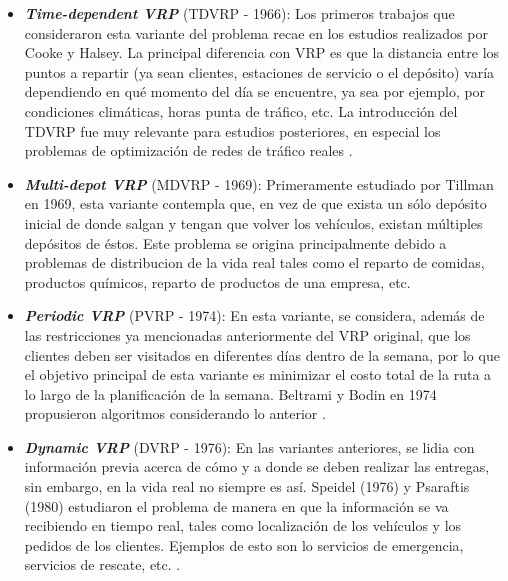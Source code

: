\documentclass[letter, 10pt]{article}
\begin{document}
\begin{itemize}
    \item \textbf{\emph{Time-dependent VRP}} (TDVRP - 1966): Los primeros trabajos que consideraron esta variante del problema recae en los estudios realizados por Cooke y Halsey. La principal diferencia con VRP es que la distancia entre los puntos a repartir (ya sean clientes, estaciones de  servicio o el depósito) varía dependiendo en qué momento del día se encuentre, ya sea por ejemplo, por condiciones climáticas, horas punta de tráfico, etc. La introducción del TDVRP fue muy relevante para estudios posteriores, en especial los problemas de optimización de redes de tráfico reales  \cite{Cooke1966TheSR}.

    \item \textbf{\emph{Multi-depot VRP}} (MDVRP - 1969): Primeramente estudiado por Tillman en 1969, esta variante contempla que, en vez de que exista un sólo depósito inicial de donde salgan y tengan que volver los vehículos, existan múltiples depósitos de éstos. Este problema se origina principalmente debido a problemas de distribucion de la vida real tales como el reparto de comidas, productos químicos, reparto de productos de una empresa, etc. \cite{doi:10.1287/trsc.3.3.192}
    
    \item \textbf{\emph{Periodic VRP}} (PVRP - 1974): En esta variante, se considera, además de las restricciones ya mencionadas anteriormente del VRP original, que los clientes deben ser visitados en diferentes días dentro de la semana, por lo que el objetivo principal de esta variante es minimizar el costo total de la ruta a lo largo de la planificación de la semana. Beltrami y Bodin en 1974 propusieron algoritmos considerando lo anterior \cite{https://doi.org/10.1002/net.3230040106}.
    
    \item \textbf{\emph{Dynamic VRP}} (DVRP - 1976): En las variantes anteriores, se lidia con información previa acerca de cómo y a donde se deben realizar las entregas, sin embargo, en la vida real no siempre es así. Speidel (1976) y Psaraftis (1980) estudiaron el problema de manera en que la información se va recibiendo en tiempo real, tales como localización de los vehículos y los pedidos de los clientes. Ejemplos de esto son lo servicios de emergencia, servicios de rescate, etc.  \cite{Speidel1976EDPASSISTEDFS} \cite{doi:10.1287/trsc.14.2.130}.
    

\end{itemize}
\end{document}
